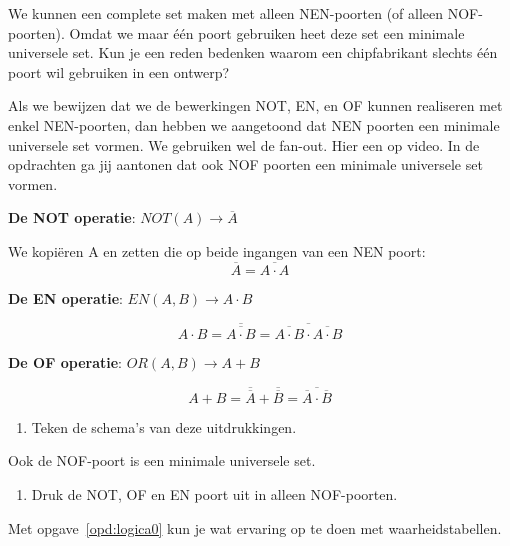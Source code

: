 \documentclass[../../main.tex]{subfiles}
\begin{document}
We kunnen een complete set maken met alleen NEN-poorten (of alleen NOF-poorten). Omdat we maar \'e\'en poort gebruiken heet deze set een minimale universele set. Kun je een reden bedenken waarom een chipfabrikant slechts \'e\'en poort wil gebruiken in een ontwerp?

Als we bewijzen dat we de bewerkingen NOT, EN, en OF kunnen realiseren met enkel NEN-poorten, dan hebben we aangetoond dat NEN poorten een minimale universele set vormen.  We gebruiken wel de fan-out. Hier een  op video. In de opdrachten ga jij aantonen dat ook NOF poorten een minimale universele set vormen. 

\textbf{De NOT operatie}: $ NOT(A) \rightarrow \overline{A}$

We kopi\"eren A en zetten die op beide ingangen van een NEN poort:
\[ \overline{A} = \overline{{A} \cdot {A}}\]
 
\textbf{De EN operatie}: $EN(A,B)\rightarrow A \cdot B$

\[ A \cdot B= \overline{\overline{{A} \cdot {B}}} = \overline{\overline{A \cdot B} \cdot \overline{A \cdot B}}\]


\textbf{De OF operatie}: $OR(A,B)\rightarrow A + B$

\[  A + B = \overline{\overline{A}} + \overline{\overline{B}} = \overline{\overline{A} \cdot \overline{B}}\]
\begin{enumerate}[resume]
\item Teken de schema's van deze uitdrukkingen.
\end{enumerate}
Ook de NOF-poort is een minimale universele set. 
\begin{enumerate}[resume]
\item Druk de NOT, OF en EN poort uit in alleen NOF-poorten.
\end{enumerate}



\iffalse%
Met opgave~\ref{opd:logica0} kun je wat ervaring op te doen met waarheidstabellen.
\end{document}
